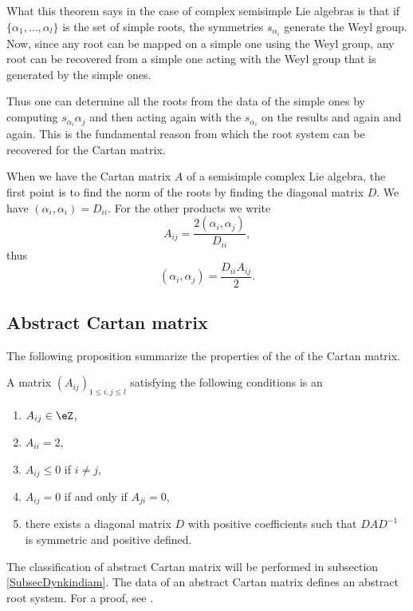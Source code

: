 What this theorem says in the case of complex semisimple Lie algebras is that if \( \{ \alpha_1,\ldots,\alpha_l \}\) is the set of simple roots, the symmetries \( s_{\alpha_i}\) generate the Weyl group. Now, since any root can be mapped on a simple one using the Weyl group, any root can be recovered from a simple one acting with the Weyl group that is generated by the simple ones.

Thus one can determine all the roots from the data of the simple ones by computing \( s_{\alpha_i}\alpha_j\) and then acting again with the \( s_{\alpha_i}\) on the results and again and again. This is the fundamental reason from which the root system can be recovered for the Cartan matrix.


When we have the Cartan matrix \( A \) of a semisimple complex Lie algebra, the first point is to find the norm of the roots by finding the diagonal matrix \( D\). We have \( (\alpha_i,\alpha_i)=D_{ii}\). For the other products we write
\begin{equation}
    A_{ij}=\frac{ 2(\alpha_i,\alpha_j) }{ D_{ii} },
\end{equation}
thus
\begin{equation}
    (\alpha_i,\alpha_j)=\frac{ D_{ii}A_{ij} }{ 2 }.
\end{equation}

\subsection{Abstract Cartan matrix}

The following proposition summarize the properties of the of the Cartan matrix.
\begin{definition}      \label{DeabstrCartanmatr}
    A matrix \( (A_{ij})_{1\leq i,j\leq l}\) satisfying the following conditions is an 
    \begin{enumerate}
        \item
            \( A_{ij}\in\eZ\),
        \item
            \( A_{ii}=2\),
        \item   \label{ItempoprCartaniii}
            \( A_{ij}\leq 0\) if \( i\neq j\),
        \item
            \( A_{ij}=0\) if and only if \( A_{ji}=0\),
        \item\label{ItempoprCartanv}
            there exists a diagonal matrix \( D\) with positive coefficients such that \( DAD^{-1}\) is symmetric and positive defined.
    \end{enumerate}
\end{definition}
The classification of abstract Cartan matrix will be performed in subsection \ref{SubsecDynkindiam}. The data of an abstract Cartan matrix defines an abstract root system. For a proof, see \cite{CartanRootProject}.

